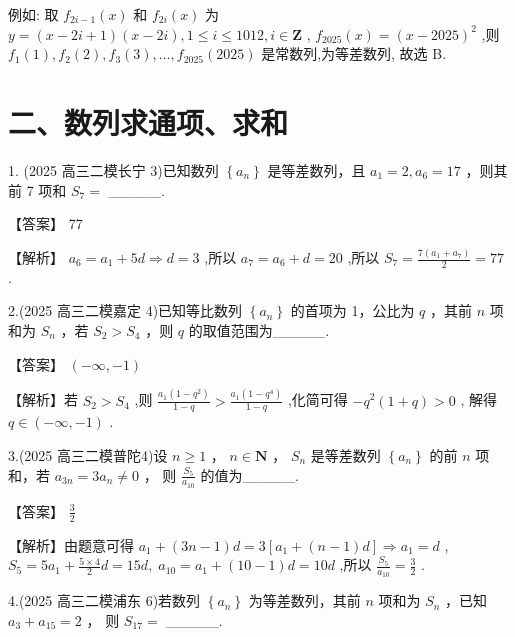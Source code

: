\documentclass[10pt]{article}
\begin{document}
例如: 取 \({f}_{{2i} - 1}\left( x\right)\) 和 \({f}_{2i}\left( x\right)\) 为 \(y = \left( {x - {2i} + 1}\right) \left( {x - {2i}}\right) ,1 \leq  i \leq  {1012},i \in  \mathbf{Z}\) , \({f}_{2025}\left( x\right)  = {\left( x - {2025}\right) }^{2}\) ,则 \({f}_{1}\left( 1\right) ,{f}_{2}\left( 2\right) ,{f}_{3}\left( 3\right) ,\ldots ,{f}_{2025}\left( {2025}\right)\) 是常数列,为等差数列, 故选 B.

\section*{二、数列求通项、求和}

1. (2025 高三二模长宁 3)已知数列 \(\left\{  {a}_{n}\right\}\) 是等差数列，且 \({a}_{1} = 2,{a}_{6} = {17}\) ，则其前 7 项和 \({S}_{7} =\) \_\_\_\_\_.

【答案】 77

【解析】 \({a}_{6} = {a}_{1} + {5d} \Rightarrow  d = 3\) ,所以 \({a}_{7} = {a}_{6} + d = {20}\) ,所以 \({S}_{7} = \frac{7\left( {{a}_{1} + {a}_{7}}\right) }{2} = {77}\) .

2.(2025 高三二模嘉定 4)已知等比数列 \(\left\{  {a}_{n}\right\}\) 的首项为 1，公比为 \(q\) ，其前 \(n\) 项和为 \({S}_{n}\) ，若 \({S}_{2} > {S}_{4}\) ，则 \(q\) 的取值范围为\_\_\_\_\_.

【答案】 \(\left( {-\infty , - 1}\right)\)

【解析】若 \({S}_{2} > {S}_{4}\) ,则 \(\frac{{a}_{1}\left( {1 - {q}^{2}}\right) }{1 - q} > \frac{{a}_{1}\left( {1 - {q}^{4}}\right) }{1 - q}\) ,化简可得 \(- {q}^{2}\left( {1 + q}\right)  > 0\) , 解得 \(q \in  \left( {-\infty , - 1}\right)\) .

3.(2025 高三二模普陀4)设 \(n \geq  1\) ， \(n \in  \mathbf{N}\) ， \({S}_{n}\) 是等差数列 \(\left\{  {a}_{n}\right\}\) 的前 \(n\) 项和，若 \({a}_{3n} = 3{a}_{n} \neq  0\) ， 则 \(\frac{{S}_{5}}{{a}_{10}}\) 的值为\_\_\_\_\_.

【答案】 \(\frac{3}{2}\)

【解析】由题意可得 \({a}_{1} + \left( {{3n} - 1}\right) d = 3\left\lbrack  {{a}_{1} + \left( {n - 1}\right) d}\right\rbrack   \Rightarrow  {a}_{1} = d\) , \({S}_{5} = 5{a}_{1} + \frac{5 \times  4}{2}d = {15d},\;{a}_{10} = {a}_{1} + \left( {{10} - 1}\right) d = {10d}\) ,所以 \(\frac{{S}_{5}}{{a}_{10}} = \frac{3}{2}\) .

4.(2025 高三二模浦东 6)若数列 \(\left\{  {a}_{n}\right\}\) 为等差数列，其前 \(n\) 项和为 \({S}_{n}\) ，已知 \({a}_{3} + {a}_{15} = 2\) ， 则 \({S}_{17} =\) \_\_\_\_\_.
\end{document}
